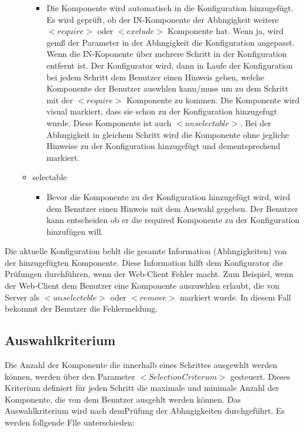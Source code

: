 \documentclass{article}
\begin{document}
\begin{itemize}
\begin{itemize}
\begin{itemize}
          \item Die Komponente wird automatisch in die Konfiguration hinzugef\"ugt.
          Es wird gepr\"uft, ob der IN-Komponente der Abhngigkeit weitere
          $<require>$ oder $<exclude>$ Komponente hat. Wenn ja, wird gem\ss{} der
          Parameter in der Abhngigkeit die Konfiguration angepasst. Wenn die
          IN-Koponente über mehrere Schritt in der Konfiguration entfernt ist. Der
          Konfigurator wird, dann in Laufe der Konfiguration bei jedem Schritt dem
          Benutzer einen Hinweis geben, welche Komponente der Benutzer auswhlen
          kann/muss um zu dem Schritt mit der $<require>$ Komponente zu kommen. Die
          Komponente wird visual markiert, dass sie schon zu der Konfiguration
          hinzugefugt wurde. Diese Komponente ist auch $<unselectable>$. Bei der
          Abhngigkeit in gleichem Schritt wird die Komponente ohne jegliche
          Hinweise zu der Konfiguration hinzugef\"ugt und dementsprechend markiert.
        \end{itemize}
    
        \item selectable
    
        \begin{itemize}
            \item Bevor die Komponente zu der Konfiguration hinzugef\"ugt wird, wird
            dem Benutzer einen Hinweis mit dem Auswahl gegeben. Der Benutzer kann
            entscheiden ob er die required Komponente zu der Konfiguration
            hinzuf\"ugen will.
        \end{itemize}
    \end{itemize}
\end{itemize}

Die aktuelle Konfiguration behlt die gesamte Information (Abhngigkeiten)
von der hinzugef\"ugten Komponente. Diese Information hilft dem Konfigurator die
Pr\"ufungen durchf\"uhren, wenn der Web-Client Fehler macht. Zum Beispiel, wenn
der Web-Client dem Benutzer eine Komponente auszuwhlen erlaubt, die von
Server als $<unselecteble>$ oder $<remove>$ markiert wurde. In diesem Fall
bekommt der Benutzer die Fehlermeldung.

\subsection{Auswahlkriterium}

Die Anzahl der Komponente die innerhalb eines Schrittes ausgewhlt werden
können, werden über den Parameter $<SelectionCriterum>$ gesteuert. Dieses
Kriterium definiert für jeden Schritt die maximale und minimale Anzahl der
Komponente, die von dem Benutzer ausgehlt werden k\"onnen. Das Auswahlkriterium 
wird nach demPr\"ufung der Abhngigkeiten durchgeführt. Es werden follgende Flle
unterschieden:
\end{document}
